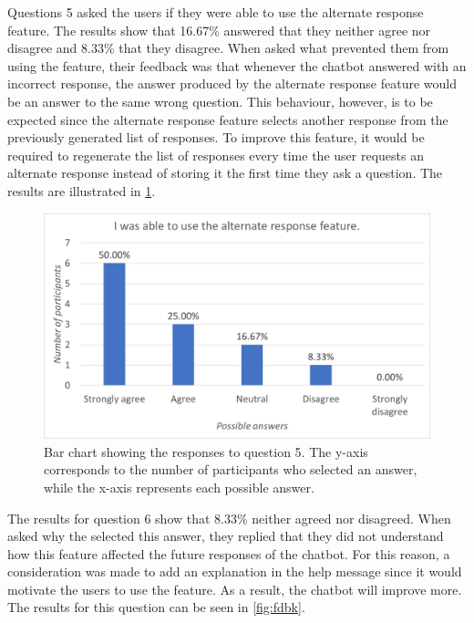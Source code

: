 \documentclass[12pt,a4paper]{article}
\newcommand{\captionstyle}[1] {
    \small{#1}
}
\begin{document}
Questions 5 asked the users if they were able to use the alternate response feature. The results show that 16.67\% answered that they neither agree nor disagree and 8.33\% that they disagree. When asked what prevented them from using the feature, their feedback was that whenever the chatbot answered with an incorrect response, the answer produced by the alternate response feature would be an answer to the same wrong question. This behaviour, however, is to be expected since the alternate response feature selects another response from the previously generated list of responses. To improve this feature, it would be required to regenerate the list of responses every time the user requests an alternate response instead of storing it the first time they ask a question. The results are illustrated in \cref{fig:altr}.

\begin{figure}[!htb]%
	\centering
	\includegraphics[width=1\columnwidth]{q5}%
	\caption[Bar chart showing the responses to question 5.]{\captionstyle{Bar chart showing the responses to question 5. The y-axis corresponds to the number of participants who selected an answer, while the x-axis represents each possible answer.}}%
	\label{fig:altr}%
\end{figure}

The results for question 6 show that 8.33\% neither agreed nor disagreed. When asked why the selected this answer, they replied that they did not understand how this feature affected the future responses of the chatbot. For this reason, a consideration was made to add an explanation in the help message since it would motivate the users to use the feature. As a result, the chatbot will improve more. The results for this question can be seen in \cref{fig:fdbk}.
\end{document}
